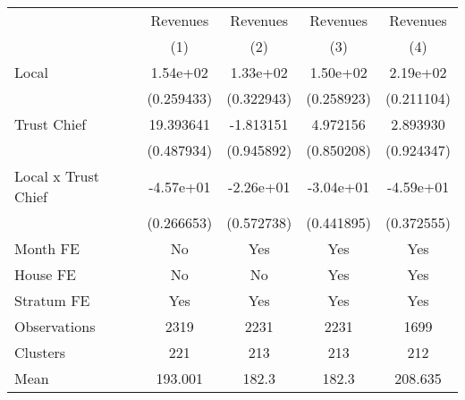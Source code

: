 {
\def\sym#1{\ifmmode^{#1}\else\(^{#1}\)\fi}
\begin{tabular}{l*{4}{c}}
\toprule
                &\multicolumn{1}{c}{Revenues}&\multicolumn{1}{c}{Revenues}&\multicolumn{1}{c}{Revenues}&\multicolumn{1}{c}{Revenues}\\
                &\multicolumn{1}{c}{(1)}         &\multicolumn{1}{c}{(2)}         &\multicolumn{1}{c}{(3)}         &\multicolumn{1}{c}{(4)}         \\
\midrule
Local           & 1.54e+02         & 1.33e+02         & 1.50e+02         & 2.19e+02         \\
                &(0.259433)         &(0.322943)         &(0.258923)         &(0.211104)         \\
Trust Chief     &19.393641         &-1.813151         & 4.972156         & 2.893930         \\
                &(0.487934)         &(0.945892)         &(0.850208)         &(0.924347)         \\
Local x Trust Chief&-4.57e+01         &-2.26e+01         &-3.04e+01         &-4.59e+01         \\
                &(0.266653)         &(0.572738)         &(0.441895)         &(0.372555)         \\
Month FE        &       No         &      Yes         &      Yes         &      Yes         \\
House FE        &       No         &       No         &      Yes         &      Yes         \\
Stratum FE      &      Yes         &      Yes         &      Yes         &      Yes         \\
\midrule
Observations    &     2319         &     2231         &     2231         &     1699         \\
Clusters        &      221         &      213         &      213         &      212         \\
Mean            &  193.001         &    182.3         &    182.3         &  208.635         \\
\bottomrule
\end{tabular}
}
